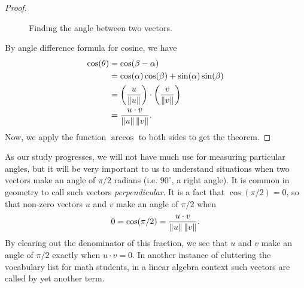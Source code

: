 \documentclass[elementsmain.tex]{subfiles}
\begin{document}
\begin{proof}
\begin{figure}[h!]
\centering
{}
\caption{Finding the angle between two vectors.}
\label{fig:angle-computation}
\end{figure}

By angle difference formula for cosine, we have
\[
\begin{split}
\cos(\theta) & = \cos(\beta - \alpha) \\
& = \cos(\alpha)\cos(\beta) + \sin(\alpha)\sin(\beta)\\
& = \left( \frac{u}{\left\|u\right\|}\right) \cdot \left( \frac{v}{\left\|v\right\|} \right) \\
& = \dfrac{u\cdot v}{\left\|u\right\|\left\|v\right\|}.
\end{split}
\]
Now, we apply the function $\arccos$ to both sides to get the theorem.
\end{proof}


As our study progresses, we will not have much use for measuring particular angles, but it will be very important to us to understand situations when two vectors make an angle of $\pi/2$ radians (i.e. $90^{\circ}$, a right angle). It is common in geometry to call such vectors \emph{perpendicular}. It is a fact that $\cos(\pi/2) = 0$, so that non-zero vectors $u$ and $v$ make an angle of $\pi/2$ when
\[
0 = \cos(\pi/2) = \dfrac{u\cdot v}{\left\|u\right\|\left\|v\right\|}.
\]
By clearing out the denominator of this fraction, we see that $u$ and $v$ make an angle of $\pi/2$ exactly when $u\cdot v = 0$. In another instance of cluttering the vocabulary list for math students, in a linear algebra context such vectors are called by yet another term.
\end{document}
